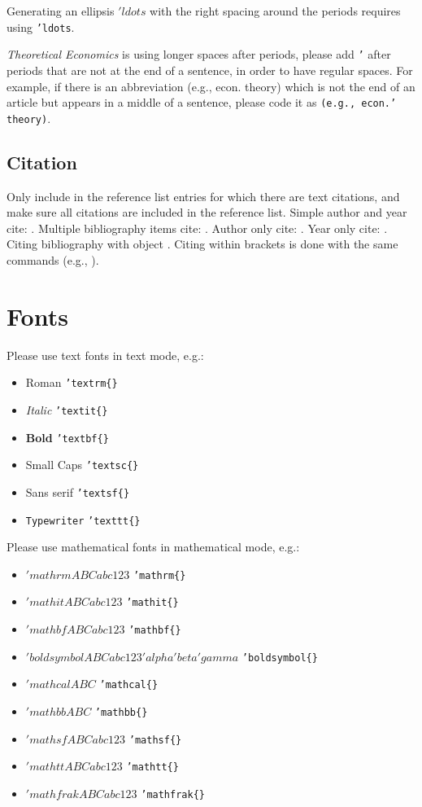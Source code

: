 \documentclass[qe,nameyear,draft]{econsocart}
\theoremstyle{plain}
\begin{document}
Generating an ellipsis $'ldots$ with the right spacing
around the periods requires using \texttt{'ldots}.

\textit{Theoretical Economics} is using longer spaces after periods, please add \texttt{'} after periods that are not at the end of a sentence, in order to have regular spaces. For example, if there is an abbreviation (e.g., econ. theory) which is not the end of an article but appears in a middle of a sentence, please code it as \texttt{(e.g., econ.' theory)}.

\subsection{Citation}

Only include in the reference list entries for which there are text citations,
and make sure all citations are included in the reference list.
Simple author and year cite: \citet{b1}.
Multiple bibliography items cite: \citet{b2, b3, b4, b5}.
Author only cite: \citet{b4}.
Year only cite: \citet{b4}. Citing bibliography with object \citet{b1}. Citing within brackets is done with the same commands (e.g., \citet{b2, b3, b4}).

\section{Fonts}

Please use text fonts in text mode, e.g.:

\begin{itemize}
\item Roman \texttt{'textrm\{\}}
\item \textit{Italic} \texttt{'textit\{\}}
\item \textbf{Bold} \texttt{'textbf\{\}}
\item Small Caps \texttt{'textsc\{\}}
\item Sans serif \texttt{'textsf\{\}}
\item \texttt{Typewriter} \texttt{'texttt\{\}}
\end{itemize}

Please use mathematical fonts in mathematical mode, e.g.:

\begin{itemize}
\item $'mathrm{ABCabc123}$ \texttt{'mathrm\{\}}
\item $'mathit{ABCabc123}$ \texttt{'mathit\{\}}
\item $'mathbf{ABCabc123}$ \texttt{'mathbf\{\}}
\item $'boldsymbol{ABCabc123'alpha'beta'gamma}$ \texttt{'boldsymbol\{\}}
\item $'mathcal{ABC}$ \texttt{'mathcal\{\}}
\item $'mathbb{ABC}$ \texttt{'mathbb\{\}}
\item $'mathsf{ABCabc123}$ \texttt{'mathsf\{\}}
\item $'mathtt{ABCabc123}$ \texttt{'mathtt\{\}}
\item $'mathfrak{ABCabc123}$ \texttt{'mathfrak\{\}}
\end{itemize}
\end{document}
